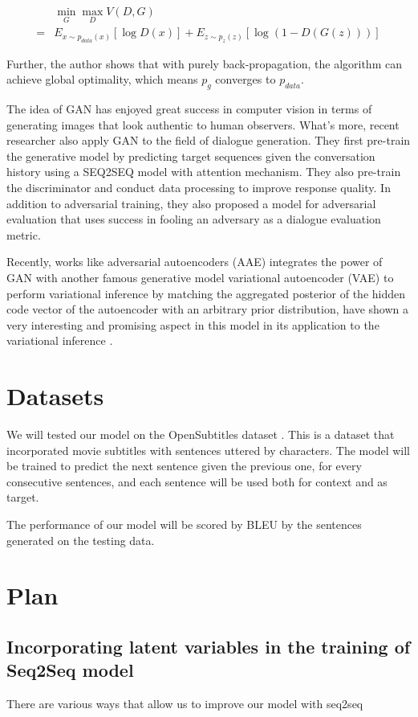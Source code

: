 \documentclass{article}
\begin{document}
\begin{align*}
& \min_G \max_D V(D,G) \\
= & E_{x\sim p_{data}(x)}[\log D(x)] + E_{z\sim p_z(z)}[\log (1-D(G(z)))]
\end{align*}

Further, the author shows that with purely back-propagation, the algorithm can achieve global optimality, which means $p_g$ converges to $p_{data}$.

The idea of GAN has enjoyed great success in computer vision in terms of generating images that look authentic to human observers. What's more, recent researcher also apply GAN to the field of dialogue generation. They first pre-train the generative model by predicting target sequences given the conversation history using a SEQ2SEQ model with attention mechanism. They also pre-train the discriminator and conduct data processing to improve response quality. In addition to adversarial training, they also proposed a model for adversarial evaluation that uses success in fooling an adversary as a dialogue evaluation metric.

Recently, works like adversarial autoencoders (AAE) \cite{aae } integrates the power of GAN with another famous generative model variational autoencoder (VAE) to perform variational inference by matching the aggregated posterior of the hidden code vector of the autoencoder with an arbitrary prior distribution, have shown a very interesting and promising aspect in this model in its application to the variational inference .

\section{Datasets}

We will tested our model on the OpenSubtitles
dataset \cite{opensubtitle}. This is a dataset that incorporated movie subtitles with sentences uttered by characters.
The model will be trained to predict the next sentence given the previous one, for every consecutive sentences, and each sentence will be used both for context and as target.

The performance of our model will be scored by BLEU by the sentences generated on the testing data. 
 

\section{Plan}

\subsection{Incorporating latent variables in the training of Seq2Seq model}
There are various ways that allow us to improve our model with seq2seq 
\end{document}
